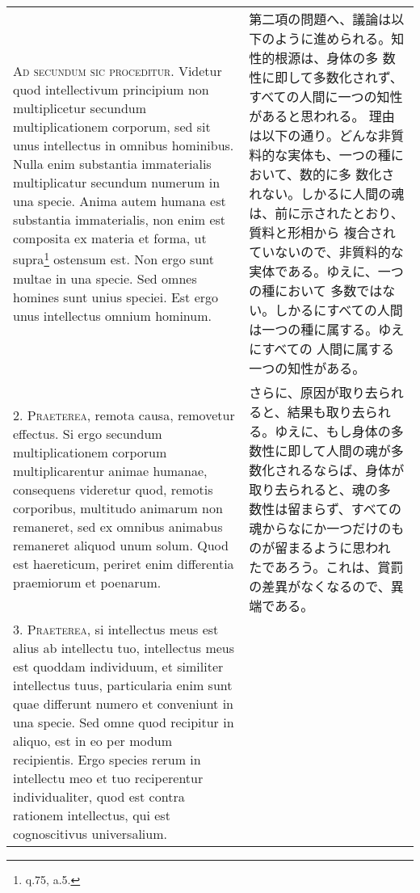 \documentclass[paper=a4paper,fontsize=10pt,jafontsize=9pt,titlepage]{jlreq}
\begin{document}
\begin{longtable}{p{21em}p{21em}}
{\scshape Ad secundum sic proceditur}. Videtur quod intellectivum
principium non multiplicetur secundum multiplicationem corporum, sed
sit unus intellectus in omnibus hominibus. Nulla enim substantia
immaterialis multiplicatur secundum numerum in una specie. Anima autem
humana est substantia immaterialis, non enim est composita ex materia
et forma, ut supra\footnote{q.75, a.5.} ostensum est. Non ergo sunt multae in una
specie. Sed omnes homines sunt unius speciei. Est ergo unus
intellectus omnium hominum.

&

 第二項の問題へ、議論は以下のように進められる。知性的根源は、身体の多
 数性に即して多数化されず、すべての人間に一つの知性があると思われる。
 理由は以下の通り。どんな非質料的な実体も、一つの種において、数的に多
 数化されない。しかるに人間の魂は、前に示されたとおり、質料と形相から
 複合されていないので、非質料的な実体である。ゆえに、一つの種において
 多数ではない。しかるにすべての人間は一つの種に属する。ゆえにすべての
 人間に属する一つの知性がある。
 
 
\\

2. {\scshape Praeterea}, remota causa, removetur effectus. Si ergo
secundum multiplicationem corporum multiplicarentur animae humanae,
consequens videretur quod, remotis corporibus, multitudo animarum non
remaneret, sed ex omnibus animabus remaneret aliquod unum solum. Quod
est haereticum, periret enim differentia praemiorum et poenarum.

&

さらに、原因が取り去られると、結果も取り去られる。ゆえに、もし身体の多
数性に即して人間の魂が多数化されるならば、身体が取り去られると、魂の多
数性は留まらず、すべての魂からなにか一つだけのものが留まるように思われ
たであろう。これは、賞罰の差異がなくなるので、異端である。
 
\\



3. {\scshape Praeterea}, si intellectus meus est alius ab intellectu
tuo, intellectus meus est quoddam individuum, et similiter intellectus
tuus, particularia enim sunt quae differunt numero et conveniunt in
una specie. Sed omne quod recipitur in aliquo, est in eo per modum
recipientis. Ergo species rerum in intellectu meo et tuo reciperentur
individualiter, quod est contra rationem intellectus, qui est
cognoscitivus universalium.

&


\end{longtable}
\end{document}
